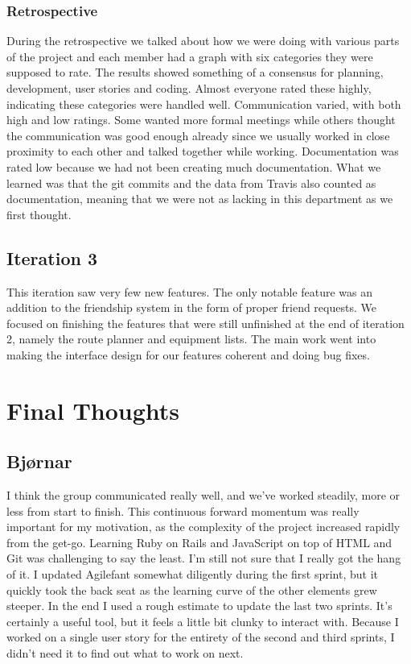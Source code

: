 \documentclass[a4paper]{article}
\begin{document}
\subsubsection{Retrospective}
During the retrospective we talked about how we were doing with various parts of the project and each member had a graph with six categories they were supposed to rate. The results showed something of a consensus for planning, development, user stories and coding. Almost everyone rated these highly, indicating these categories were handled well. Communication varied, with both high and low ratings. Some wanted more formal meetings while others thought the communication was good enough already since we usually worked in close proximity to each other and talked together while working. Documentation was rated low because we had not been creating much documentation. What we learned was that the git commits and the data from Travis also counted as documentation, meaning that we were not as lacking in this department as we first thought.

\subsection{Iteration 3}
This iteration saw very few new features. The only notable feature was an addition to the friendship system in the form of proper friend requests. We focused on finishing the features that were still unfinished at the end of iteration 2, namely the route planner and equipment lists. The main work went into making the interface design for our features coherent and doing bug fixes.


\section{Final Thoughts}

\subsection{Bjørnar}
I think the group communicated really well, and we've worked steadily, more or less from start to finish. This continuous forward momentum was really important for my motivation, as the complexity of the project increased rapidly from the get-go. Learning Ruby on Rails and JavaScript on top of HTML and Git was challenging to say the least. I'm still not sure that I really got the hang of it. I updated Agilefant somewhat diligently during the first sprint, but it quickly took the back seat as the learning curve of the other elements grew steeper. In the end I used a rough estimate to update the last two sprints. It's certainly a useful tool, but it feels a little bit clunky to interact with. Because I worked on a single user story for the entirety of the second and third sprints, I didn't need it to find out what to work on next.\\
\end{document}
